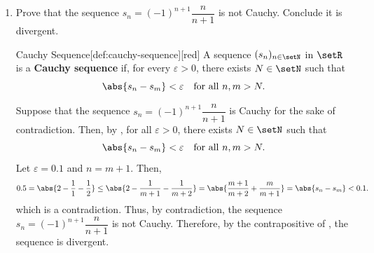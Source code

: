 \begin{enumerate}
    

  \item Prove that the sequence \(s_n=(-1)^{n+1}\dfrac{n}{n+1}\) is not Cauchy. 
  Conclude it is divergent.
  \begin{define}{Cauchy Sequence}[def:cauchy-sequence][red]
    A sequence \((s_n)_{n\in\setN}\) in \(\setR\) is a \textbf{Cauchy sequence} if,
    for every \(\varepsilon>0\), there exists \(N\in\setN\) such that
    \[
      \abs{s_n - s_m} < \varepsilon \quad\text{for all } n, m > N.
    \]
  \end{define}  
  \begin{subprove}
    Suppose that the sequence \(s_n=(-1)^{n+1}\dfrac{n}{n+1}\) is Cauchy 
    for the sake of contradiction.
    Then, by , for all \(\varepsilon > 0\), there exists \(N \in \setN\) such that
    \[
      \abs{s_n - s_m} < \varepsilon \quad\text{for all } n, m > N.
    \]
    Let \(\varepsilon = 0.1\) and \(n=m+1\). Then,
    \[
      0.5 =\abs{2 - \frac{1}{1} - \frac{1}{2}} \le \abs{2 - \frac{1}{m+1} - \frac{1}{m+2}} = \abs{\dfrac{m+1}{m+2} + \dfrac{m}{m+1}} = \abs{s_n - s_m} < 0.1.
    \]
    which is a contradiction.
    Thus, by contradiction, the sequence \(s_n=(-1)^{n+1}\dfrac{n}{n+1}\) is not Cauchy.
    Therefore, by the contrapositive of , the sequence is divergent.
  \end{subprove}



\end{enumerate}
